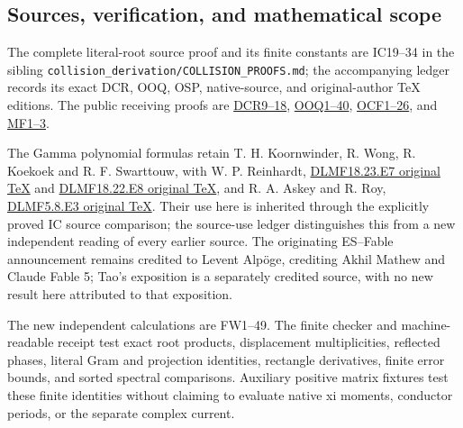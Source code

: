 \documentclass[11pt]{article}
\begin{document}
\subsection{Sources, verification, and mathematical scope}\label{sources-verification-and-mathematical-scope}

The complete literal-root source proof and its finite constants are IC19--34 in the sibling \texttt{collision\_derivation/COLLISION\_PROOFS.md}; the accompanying ledger records its exact DCR, OOQ, OSP, native-source, and original-author TeX editions. The public receiving proofs are \href{https://github.com/KokunoYumeto/zeta-function-research-reader/blob/7230c00b9f07dd222b2aea95427d67918f3a8cac/workbenches/splitzero-tandem/continuations/20260921-local-covariance-activation/009/CONDUCTOR_DIVISOR_COVARIANCE_RETURN.tex\#L139}{DCR9--18}, \href{https://github.com/KokunoYumeto/zeta-function-research-reader/blob/5992ad50c0f2a06921f1fcaded7b4e38097c0739/workbenches/splitzero-tandem/continuations/20260920-original-kernel-mixed-determinants/providers/09_INPUT_CUMULATIVE_PROOFS.tex\#L23179}{OOQ1--40}, \href{https://github.com/KokunoYumeto/zeta-function-research-reader/blob/5992ad50c0f2a06921f1fcaded7b4e38097c0739/workbenches/splitzero-tandem/continuations/20260920-original-kernel-mixed-determinants/providers/ORIGINAL_CONDUCTOR_STRIP_FRAME.tex}{OCF1--26}, and \href{https://github.com/KokunoYumeto/zeta-function-research-reader/blob/cb9705da84d6f8689611914ed9659298e620ba0a/workbenches/splitzero-tandem/continuations/20260921-moving-rational-family/ACTIVATED_RATIONAL_PROOFS.md}{MF1--3}.

The Gamma polynomial formulas retain T. H. Koornwinder, R. Wong, R. Koekoek and R. F. Swarttouw, with W. P. Reinhardt, \href{https://dlmf.nist.gov/18.23.E7.tex}{DLMF18.23.E7 original TeX} and \href{https://dlmf.nist.gov/18.22.E8.tex}{DLMF18.22.E8 original TeX}, and R. A. Askey and R. Roy, \href{https://dlmf.nist.gov/5.8.E3.tex}{DLMF5.8.E3 original TeX}. Their use here is inherited through the explicitly proved IC source comparison; the source-use ledger distinguishes this from a new independent reading of every earlier source. The originating ES--Fable announcement remains credited to Levent Alpöge, crediting Akhil Mathew and Claude Fable 5; Tao's exposition is a separately credited source, with no new result here attributed to that exposition.

The new independent calculations are FW1--49. The finite checker and machine-readable receipt test exact root products, displacement multiplicities, reflected phases, literal Gram and projection identities, rectangle derivatives, finite error bounds, and sorted spectral comparisons. Auxiliary positive matrix fixtures test these finite identities without claiming to evaluate native xi moments, conductor periods, or the separate complex current.
\end{document}
